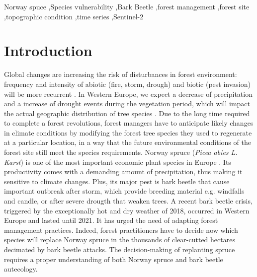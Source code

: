 \documentclass[3p,procedia]{elsarticle}
\begin{document}
\begin{frontmatter}
\begin{abstract}
\fi
\end{abstract}

\begin{keyword}
  Norway spuce \sep Species vulnerability \sep Bark Beetle \sep forest management \sep forest site \sep topographic condition \sep time series \sep Sentinel-2
\end{keyword}

\end{frontmatter}

\linenumbers

\section{Introduction}

Global changes are increasing the risk of disturbances in forest environment: frequency and intensity of abiotic (fire, storm, drough) and biotic (pest invasion) will be more recurrent \citep{lindner_climate_2010}.
In Western Europe, we expect a decrease of precipitation and a increase of drought events during the vegetation period, which will impact the actual geographic distribution of tree species \citep{hanewinkel2013climate}.
Due to the long time required to complete a forest revolutions, forest managers have to anticipate likely changes in climate conditions by modifying the forest tree species they used to regenerate at a particular location, in a way that the future environmental conditions of the forest site still meet the species requirements.
Norway spruce (\textit{Picea abies L. Karst}) is one of the most important economic plant species in Europe \citep{nystedt_norway_2013}.
Its productivity comes with a demanding amount of precipitation, thus making it sensitive to climate changes.
Plus, its major pest is bark beetle that cause important outbreak after storm, which provide breeding material e.g. windfalls and candle, or after severe drougth that weaken trees.
A recent bark beetle crisis, triggered by the exceptionally hot and dry weather of 2018, occurred in Western Europe and lasted until 2021. 
It has urged the need of adapting forest management practices. 
Indeed, forest practitioners have to decide now which species will replace Norway spruce in the thousands of clear-cutted hectares decimated by bark beetle attacks. 
The decision-making of replanting spruce requires a proper understanding of both Norway spruce and bark beetle autecology.
\end{document}
